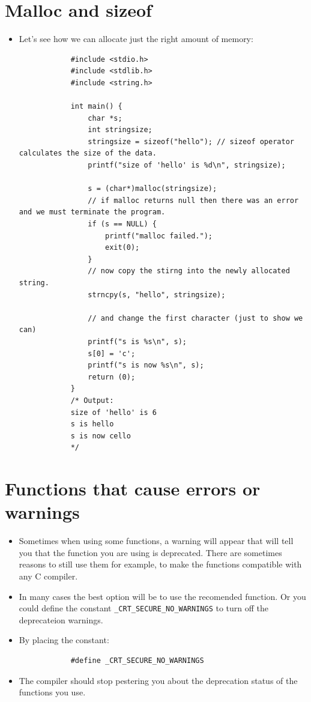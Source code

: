 \section{Malloc and sizeof}
\begin{itemize}
    \item Let's see how we can allocate just the right amount of memory:
        \begin{verbatim}
            #include <stdio.h>
            #include <stdlib.h>
            #include <string.h>

            int main() {
                char *s;
                int stringsize;
                stringsize = sizeof("hello"); // sizeof operator calculates the size of the data.
                printf("size of 'hello' is %d\n", stringsize);

                s = (char*)malloc(stringsize);
                // if malloc returns null then there was an error and we must terminate the program.
                if (s == NULL) {
                    printf("malloc failed.");
                    exit(0);
                }
                // now copy the stirng into the newly allocated string.
                strncpy(s, "hello", stringsize);

                // and change the first character (just to show we can)
                printf("s is %s\n", s);
                s[0] = 'c';
                printf("s is now %s\n", s);
                return (0);
            }
            /* Output:
            size of 'hello' is 6
            s is hello
            s is now cello
            */
        \end{verbatim}
\end{itemize}

\section{Functions that cause errors or warnings}
\begin{itemize}
    \item Sometimes when using some functions, a warning will appear that will tell you that the function you are using is deprecated. There are sometimes reasons to still use them for example, to make the functions compatible with any C compiler. 
    \item In many cases the best option will be to use the recomended function. Or you could define the constant \texttt{_CRT_SECURE_NO_WARNINGS} to turn off the deprecateion warnings.
    \item By placing the constant:
        \begin{verbatim}
            #define _CRT_SECURE_NO_WARNINGS
        \end{verbatim}
    
    \item The compiler should stop pestering you about the deprecation status of the functions you use.
\end{itemize}

